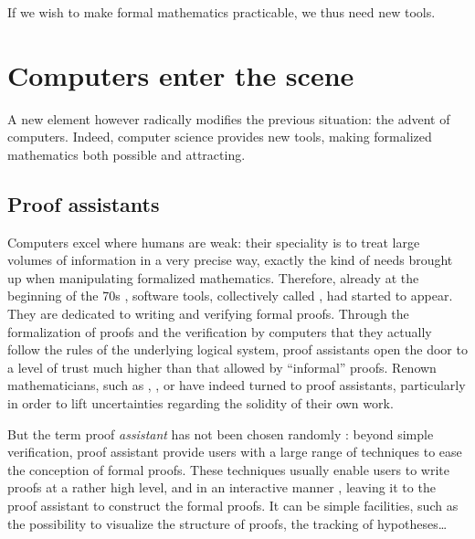 If we wish to make formal mathematics practicable, we thus need new tools.

\section{Computers enter the scene}
\label{sec:proof-assistants}

A new element however radically modifies the previous situation: the advent of computers.
Indeed, computer science provides new tools, making formalized mathematics both possible
and attracting.

\subsection{Proof assistants}

Computers excel where humans are weak: their speciality is to treat large volumes of
information in a very precise way, exactly the kind of needs brought up when manipulating
formalized mathematics. Therefore, already at the beginning of the 70s%
%
%
,
software tools, collectively called , had started to
appear. They are dedicated to writing and verifying formal proofs.
Through the formalization of proofs and the verification by computers that they
actually follow the rules of the underlying logical system, proof assistants open the
door to a level of trust much higher than that allowed by “informal” proofs.
Renown mathematicians, such as ,
, or  have indeed
turned to proof assistants, particularly in order to lift uncertainties regarding the
solidity of their own work.

But the term proof \emph{assistant} has not been chosen randomly : beyond simple verification,
proof assistant provide users with a large range of techniques to ease the conception of
formal proofs. These techniques usually enable users to write proofs at a rather
high level, and in an interactive manner%
,
leaving it to the proof assistant to construct the formal proofs.
It can be simple facilities, such as the possibility to visualize the structure of proofs,
the tracking of hypotheses…

